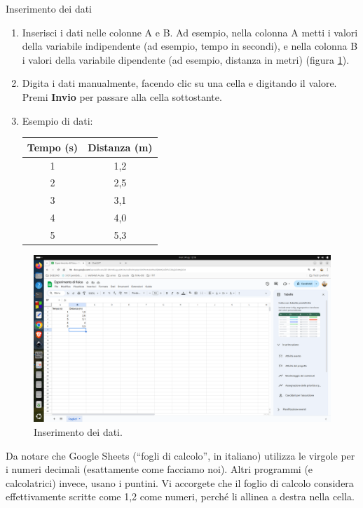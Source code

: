 \documentclass[12pt,a4paper,oneside]{book}
\makeatletter
\renewcommand{\subsection}{\@startsection {subsection}{2}{\z@}
{-3ex \@plus -0.1ex \@minus -.4ex}
{0.5ex \@plus.2ex }
{\color[rgb]{0.141,0.596,0.749}\normalfont\sffamily\bfseries}}
\theoremstyle{esercizio}
\makeatother
\begin{document}
\subsection{Inserimento dei dati}
\begin{enumerate}
    \item Inserisci i dati nelle colonne A e B. Ad esempio, nella colonna A metti i valori della variabile indipendente (ad esempio, tempo in secondi), e nella colonna B i valori della variabile dipendente (ad esempio, distanza in metri) (figura \ref{fig:dati}).
    \item Digita i dati manualmente, facendo clic su una cella e digitando il valore. Premi \textbf{Invio} per passare alla cella sottostante.
    \item Esempio di dati:
    \begin{center}
    \begin{tabular}{|c|c|}
    \hline
    Tempo (s) & Distanza (m) \\
    \hline
    1 & 1,2 \\
    2 & 2,5 \\
    3 & 3,1 \\
    4 & 4,0 \\
    5 & 5,3 \\
    \hline
    \end{tabular}
    \end{center}
\end{enumerate}
    \begin{figure}[h!]
    \centering
    \includegraphics[width=\linewidth]{path_to_image/dati.png} 
    \caption{Inserimento dei dati.}
    \label{fig:dati}
\end{figure} 

Da notare che Google Sheets (``fogli di calcolo'', in italiano) utilizza le virgole per i numeri decimali (esattamente come facciamo noi). Altri programmi (e calcolatrici) invece, usano i puntini. Vi accorgete che il foglio di calcolo considera effettivamente scritte come 1,2 come numeri, perché li allinea a destra nella cella.
\end{document}
